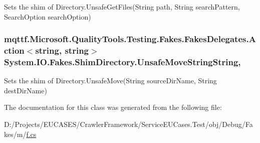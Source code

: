 Sets the shim of Directory.\-Unsafe\-Get\-Files(\-String path, String search\-Pattern, Search\-Option search\-Option)

\hypertarget{class_system_1_1_i_o_1_1_fakes_1_1_shim_directory_a154cddad58b9ff7ee385a75a1ac71bbf}{
\subsubsection[{Unsafe\-Move\-String\-String}]{\setlength{\rightskip}{0pt plus 5cm}mqttf.\-Microsoft.\-Quality\-Tools.\-Testing.\-Fakes.\-Fakes\-Delegates.\-Action$<$string, string$>$ System.\-I\-O.\-Fakes.\-Shim\-Directory.\-Unsafe\-Move\-String\-String\hspace{0.3cm}{\ttfamily [static]}, {\ttfamily [set]}}}\label{class_system_1_1_i_o_1_1_fakes_1_1_shim_directory_a154cddad58b9ff7ee385a75a1ac71bbf}


Sets the shim of Directory.\-Unsafe\-Move(\-String source\-Dir\-Name, String dest\-Dir\-Name)



The documentation for this class was generated from the following file\-:\begin{DoxyCompactItemize}
\item 
D\-:/\-Projects/\-E\-U\-C\-A\-S\-E\-S/\-Crawler\-Framework/\-Service\-E\-U\-Cases.\-Test/obj/\-Debug/\-Fakes/m/\hyperlink{m_2f_8cs}{f.\-cs}\end{DoxyCompactItemize}
